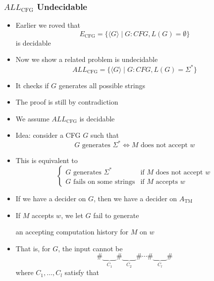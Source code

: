 \begin{frame}[allowframebreaks]
\frametitle{$ALL_{\text{CFG}}$ Undecidable}
\begin{itemize}
\item Earlier we roved that
  \begin{equation*}
  E_{\text{CFG}}
=\{\langle  G\rangle \mid
G: CFG, L(G)=\emptyset\}
\end{equation*}
is decidable
\item Now we show a related problem is undecidable
  \begin{equation*}
  ALL_{\text{CFG}}
=\{\langle  G\rangle \mid
G: CFG, L(G)=\Sigma^* \}
\end{equation*}
\item It checks if $G$ generates all possible strings
\item The proof is still by contradiction
\item[]  We assume $ALL_{\text{CFG}}$ is decidable
\item Idea: consider a CFG $G$ such that
  \begin{equation*}
    G \text{ generates } \Sigma^*
    \Leftrightarrow
    M \text{ does not accept } w
  \end{equation*}
\item This is equivalent to
  \begin{equation*}
    \begin{cases}
      G \text{ generates } \Sigma^*
      &
      \text{if } M \text{ does not accept } w \\
      G \text{ fails on some strings} 
      &
      \text{if } M \text{ accepts } w 
    \end{cases}
  \end{equation*}
\item If we have a decider on $G$, then we have
  a decider on $A_{\text{TM}}$
\item If $M$ accepts $w$, we let $G$ fail to generate
  \begin{center}
    an accepting computation history for $M$ on $w$
  \end{center}
\item That is, for $G$, the input cannot be
  \begin{equation*}
    \#\underbrace{\qquad}_{C_1}\#\underbrace{\qquad}_{C_2}\#\cdots\#\underbrace{\qquad}_{C_l}\#
  \end{equation*}
where $C_1, \ldots, C_l$ satisfy that
  \begin{center}
  \begin{tabular}{l}

\end{tabular}
\end{center}
\end{itemize}
\end{frame}
